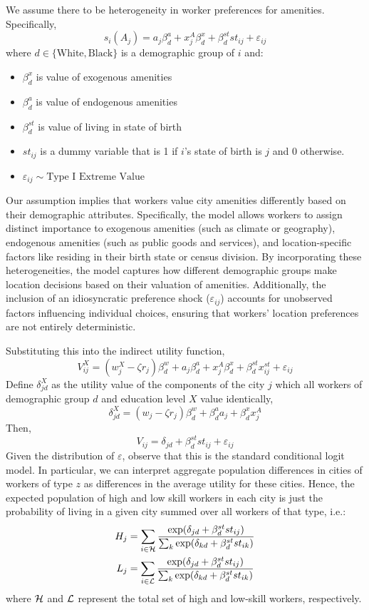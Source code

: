 \documentclass{article}
\begin{document}
We assume there to be heterogeneity in worker preferences for amenities. Specifically,
\begin{equation}\label{eq_worker_amenities}
    s_i(A_{j}) = a_{j}\beta_d^a + x_{j}^A\beta_d^x + \beta_d^{st}st_{ij} +  \varepsilon_{ij}
\end{equation}
where $d\in\{\text{White}, \text{Black}\}$ is a demographic group of $i$ and:
\begin{itemize}
    \item $\beta_d^x$ is value of exogenous amenities
    \item $\beta_d^{a}$ is value of endogenous amenities
    \item $\beta_d^{st}$ is value of living in state of birth 
    \item $st_{ij}$ is a dummy variable that is 1 if $i$'s state of birth is $j$ and 0 otherwise.
    \item $\varepsilon_{ij}\sim\text{Type I Extreme Value}$
\end{itemize}
Our assumption implies that workers value city amenities differently based on their demographic attributes. Specifically, the model allows workers to assign distinct importance to exogenous amenities (such as climate or geography), endogenous amenities (such as public goods and services), and location-specific factors like residing in their birth state or census division. By incorporating these heterogeneities, the model captures how different demographic groups make location decisions based on their valuation of amenities. Additionally, the inclusion of an idiosyncratic preference shock ($\varepsilon_{ij}$) accounts for unobserved factors influencing individual choices, ensuring that workers' location preferences are not entirely deterministic.


Substituting this into the indirect utility function,
$$V_{ij}^X = (w_{j}^X-\zeta r_{j})\beta^w_d  + a_{j}\beta_d^a + x_{j}^A\beta_d^x + \beta_d^{st}x_{ij}^{st} + \varepsilon_{ij}$$ 
Define $\delta_{jd}^X$ as the utility value of the components of the city $j$ which all workers of demographic group $d$ and education level $X$ value identically,
$$\delta_{jd}^X = (w_{j} - \zeta r_{j})\beta_d^w + \beta^a_d a_{j} + \beta^x_d x_{j}^A$$
Then,
$$V_{ij} = \delta_{jd} + \beta^{st}_d st_{ij} + \varepsilon_{ij}$$
Given the distribution of $\varepsilon$, observe that this is the standard conditional logit model. In particular, we can interpret aggregate population differences in cities of workers of type $z$ as differences in the average utility for these cities. Hence, the expected population of high and low skill workers in each city is just the probability of living in a given city summed over all workers of that type, i.e.: 
\begin{align}
H_{j} &= \sum_{i\in\mathcal{H}} \frac{\exp(\delta_{jd} + \beta_d^{st}st_{ij})}{\sum_{k} \exp(\delta_{kd} + \beta_d^{st}st_{ik})} \\
L_{j} &= \sum_{i\in\mathcal{L}} \frac{\exp(\delta_{jd} + \beta_d^{st}st_{ij})}{\sum_{k} \exp(\delta_{kd} + \beta_d^{st}st_{ik})}
\end{align}
where $\mathcal{H}$ and $\mathcal{L}$ represent the total set of high and low-skill workers, respectively.
\end{document}
